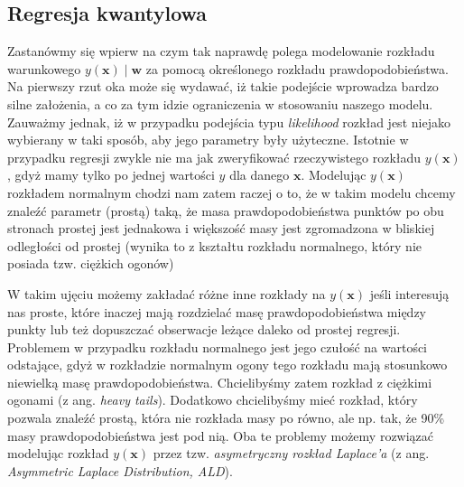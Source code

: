 \documentclass{myclass}
\numberwithin{equation}{subsection}
\begin{document}
\subsection{Regresja kwantylowa}

Zastanówmy się wpierw na czym tak naprawdę polega modelowanie rozkładu warunkowego \(y(\bm{x}) \mid
\bm{w}\) za pomocą określonego rozkładu prawdopodobieństwa. Na pierwszy rzut oka może się wydawać,
iż takie podejście wprowadza bardzo silne założenia, a co za tym idzie ograniczenia w stosowaniu
naszego modelu. Zauważmy jednak, iż w przypadku podejścia typu \textit{likelihood} rozkład jest
niejako wybierany w taki sposób, aby jego parametry były użyteczne. Istotnie w przypadku regresji
zwykle nie ma jak zweryfikować rzeczywistego rozkładu \(y(\bm{x})\), gdyż mamy tylko po jednej
wartości \(y\) dla danego \(\bm{x}\). Modelując \(y(\bm{x})\) rozkładem normalnym chodzi nam zatem
raczej o to, że w takim modelu chcemy znaleźć parametr (prostą) taką, że masa prawdopodobieństwa
punktów po obu stronach prostej jest jednakowa i większość masy jest zgromadzona w bliskiej
odległości od prostej (wynika to z kształtu rozkładu normalnego, który nie posiada tzw. ciężkich
ogonów)

W takim ujęciu możemy zakładać różne inne rozkłady na \(y(\bm{x})\) jeśli interesują nas proste,
które inaczej mają rozdzielać masę prawdopodobieństwa między punkty lub też dopuszczać obserwacje
leżące daleko od prostej regresji. Problemem w przypadku rozkładu normalnego jest jego czułość na
wartości odstające, gdyż w rozkładzie normalnym ogony tego rozkładu mają stosunkowo niewielką masę
prawdopodobieństwa. Chcielibyśmy zatem rozkład z ciężkimi ogonami (z ang. \textit{heavy tails}).
Dodatkowo chcielibyśmy mieć rozkład, który pozwala znaleźć prostą, która nie rozkłada masy po równo,
ale np. tak, że 90\% masy prawdopodobieństwa jest pod nią. Oba te problemy możemy rozwiązać
modelując rozkład \(y(\bm{x})\) przez tzw. \emph{asymetryczny rozkład Laplace'a} (z ang.
\textit{Asymmetric Laplace Distribution, ALD}).
\end{document}
